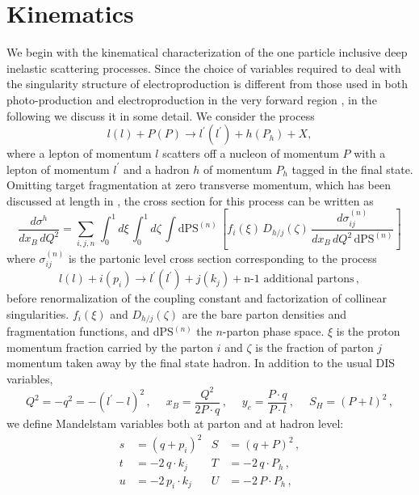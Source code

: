 \documentclass[superscriptaddress,showkeys,showpacs]{revtex4}
\begin{document}
\section{Kinematics}
We begin with the kinematical characterization of the one particle inclusive 
deep inelastic scattering processes. Since the choice of variables required  
to deal with the singularity structure of electroproduction is different 
from those used in both photo-production \cite{Aurenche:1983eq,Gordon:1994wu,deFlorian:1998fq} and electroproduction 
in the very forward region \cite{gluon,quark}, in the following we discuss it in some detail. We consider the process 
\begin{equation}
l(l)+P(P)\longrightarrow l^{\prime}(l^\prime)+h(P_h)+X,
\end{equation}
where a lepton of momentum $l$ scatters off a nucleon of momentum $P$ with 
a lepton of momentum $l^{\prime}$ and a hadron $h$ of momentum $P_h$ tagged 
in the final state. Omitting target fragmentation at zero transverse momentum, 
which has been discussed at length in \cite{gluon,quark}, the cross 
section for this process can be written as 
\begin{equation}\label{eq:dsigma}
\frac{d\sigma^{h}}{dx_B\, dQ^2}=\sum_{i,j,n}\,\int_{0}^{1}d\xi\,\int_{0}^{1}d\zeta\,\int 
\mbox{dPS}^{(n)}\,\left[f_i(\xi)\,D_{h/j}(\zeta)\,\frac{
d\sigma^{(n)}_{ij}}{dx_{B}\,dQ^2\,\mbox{dPS}^{(n)}}\right]
\end{equation}
where $\sigma^{(n)}_{ij}$ is the partonic level cross section 
corresponding to the process
\begin{equation}
l(l)+i(p_i)\longrightarrow l^{\prime}(l^{\prime})+j(k_j)+
\mbox{n-1 additional partons}\,,
\end{equation}
before renormalization of the coupling constant and factorization of collinear singularities. $f_i(\xi)$ and $D_{h/j}(\zeta)$ are the bare parton densities and fragmentation functions, and dPS$^{(n)}$ the $n$-parton phase space.
$\xi$ is the proton momentum fraction carried by the parton  $i$ and 
$\zeta$ is the fraction of parton $j$ momentum taken away by the final 
state hadron. In addition to the usual DIS variables,
\begin{equation}
Q^2=-q^2=-(l^{\prime}-l)^2\,,\;\,\,\,\,\,\,x_{B}=\frac{Q^2}{2 P\cdot q}\,,\;\,\,\,\,\,\,y_e=\frac{P\cdot q}{P\cdot l}\,,\;\,\,\,\,\,\, S_H=(P+l)^2\,,
\end{equation}
we define Mandelstam variables both at parton and at hadron level:
\begin{align}
s&=(q+p_i)^2 &S&=(q+P)^2\,,\\
t&=-2\,q\cdot k_j &T&=-2\,q\cdot P_h\,,\\
u&=-2\,p_i\cdot k_j&U&=-2\,P\cdot P_h\,,
\end{align}
\end{document}
